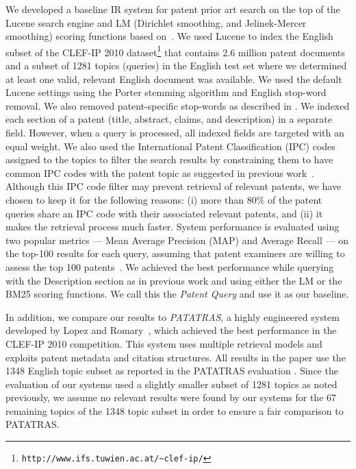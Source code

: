 We developed a baseline IR system for patent prior art search on the top of
the Lucene search engine
and LM (Dirichlet
smoothing, and Jelinek-Mercer smoothing)
scoring functions based on~\cite{Bouadjenek2015}. %
We used Lucene to index the English subset of the CLEF-IP 2010 dataset\footnote{\texttt{http://www.ifs.tuwien.ac.at/\textasciitilde{}clef-ip/}} 
that contains 2.6 million patent documents and 
a subset of 1281 topics (queries) in the English test set where we determined at least one valid, relevant English document was available.
We used the default Lucene settings using the Porter stemming algorithm 
and English stop-word removal. 
We also removed patent-specific stop-words as described in \cite{magdy2012toward}.
We indexed each section of 
a patent (title, abstract, claims,
and description) in a separate field.  However, when a query 
is processed, all indexed fields are targeted with an equal weight.
% 
We also used the International
Patent Classification (IPC) codes assigned to the topics to filter
the search results by constraining them to have common IPC codes with
the patent topic as suggested in previous work~\cite{lopez2010experiments}.
Although this IPC code filter may prevent retrieval of relevant patents, we
have chosen to keep it for the following reasons: (i) more than 80\%
of the patent queries share an IPC code with their associated relevant
patents, and (ii) it makes the retrieval process much faster. System performance is evaluated using two popular metrics --- Mean Average Precision (MAP) and Average Recall --- on the top-100 results for each query, assuming that patent examiners are willing to assess the top 100 patents~\cite{joho2010survey}. 
We achieved the best performance while querying with the Description
section as in previous work \cite{xue2009transforming} and using
either the LM or the BM25 scoring functions. We call this 
the \textit{Patent Query} and use it as our baseline.

In addition, we compare our results to \textit{PATATRAS}, a highly engineered system developed by Lopez and Romary~\cite{lopez2010experiments}, 
which achieved the best performance in the CLEF-IP 2010 competition. This system uses multiple retrieval models %
and exploits patent metadata and citation structures.  All results in the paper use the 1348 English topic subset as reported in the PATATRAS evaluation \cite{piroi2010clef}.  Since the evaluation of our systems used a slightly smaller subset of 1281 topics as noted previously, we assume no relevant results were found by our systems for the 67 remaining topics of the 1348 topic subset in order to ensure a fair comparison to PATATRAS.

